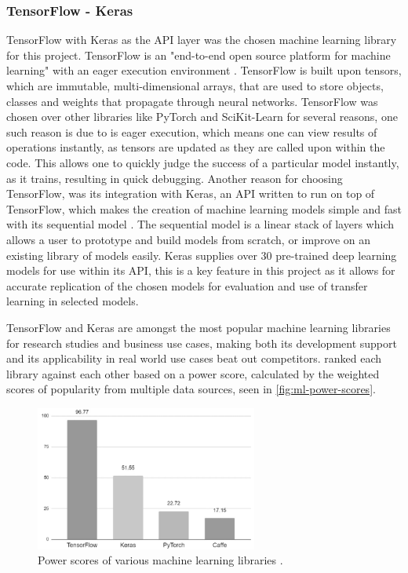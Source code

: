 \subsubsection{TensorFlow - Keras}
TensorFlow with Keras as the API layer was the chosen machine learning library for this project. TensorFlow is an "end-to-end open source platform for machine learning" with an eager execution environment \citep{TensorFl5:online}. TensorFlow is built upon tensors, which are immutable, multi-dimensional arrays, that are used to store objects, classes and weights that propagate through neural networks. TensorFlow was chosen over other libraries like PyTorch and SciKit-Learn for several reasons, one such reason is due to is eager execution, which means one can view results of operations instantly, as tensors are updated as they are called upon within the code. This allows one to quickly judge the success of a particular model instantly, as it trains, resulting in quick debugging. Another reason for choosing TensorFlow, was its integration with Keras, an API written to run on top of TensorFlow, which makes the creation of machine learning models simple and fast with its sequential model \citep{AboutKer65:online}. The sequential model is a linear stack of layers which allows a user to prototype and build models from scratch, or improve on an existing library of models easily. Keras supplies over 30 pre-trained deep learning models for use within its API, this is a key feature in this project as it allows for accurate replication of the chosen models for evaluation and use of transfer learning in selected models.

TensorFlow and Keras are amongst the most popular machine learning libraries for research studies and business use cases, making both its development support and its applicability in real world use cases beat out competitors. \cite{hale2018deep} ranked each library against each other based on a power score, calculated by the weighted scores of popularity from multiple data sources, seen in \autoref{fig:ml-power-scores}. 

\begin{figure}[H]
    \centering
    \includegraphics[width=0.65\textwidth]{figures/ml-power-sources.jpg}
    \caption{Power scores of various machine learning libraries \citep{hale2018deep}.}
    \label{fig:ml-power-scores}
\end{figure}

